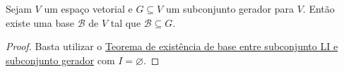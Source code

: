 \begin{theorem}
	Sejam $V$ um espaço vetorial e $G\subseteq V$ um subconjunto gerador para $V$. Então existe uma base $\mathcal{B}$ de $V$ tal que $\mathcal{B}\subseteq G$.
\end{theorem}
\begin{proof}
	Basta utilizar o \href{http://mtm.ufsc.br/~cordeiro/ensino/mtm3112.algebra.linear/06.bases/teo_base_entre_li_e_gerador_moodle.html}{Teorema de existência de base entre subconjunto LI e subconjunto gerador} com $I=\varnothing$.
\end{proof}